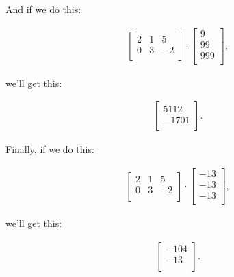 \smallskip
And if we do this:

\vspace{-.15in}
\begin{align*}
\begin{bmatrix}
2 & 1 & 5 \\
0 & 3 & -2 \\
\end{bmatrix} \cdot
\begin{bmatrix}
9 \\ 99 \\ 999 \\
\end{bmatrix},
\end{align*}
\vspace{-.15in}

we'll get this:

\vspace{-.15in}
\begin{align*}
\begin{bmatrix}
5112 \\ -1701 \\
\end{bmatrix}.
\end{align*}
\vspace{-.15in}

\smallskip
Finally, if we do this:

\vspace{-.15in}
\begin{align*}
\begin{bmatrix}
2 & 1 & 5 \\
0 & 3 & -2 \\
\end{bmatrix} \cdot
\begin{bmatrix}
-13 \\ -13 \\ -13 \\
\end{bmatrix},
\end{align*}
\vspace{-.15in}

we'll get this:

\vspace{-.15in}
\begin{align*}
\begin{bmatrix}
-104 \\ -13 \\
\end{bmatrix}.
\end{align*}
\vspace{-.15in}

